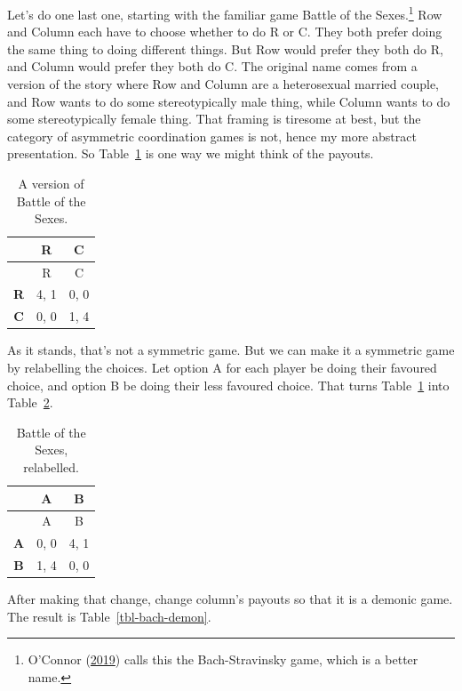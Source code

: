 \documentclass[
  12pt,
  letterpaper,
  DIV=11,
  numbers=noendperiod]{scrreprt}
\begin{document}
Let's do one last one, starting with the familiar game Battle of the
Sexes.\footnote{O'Connor (\protect\hyperlink{ref-OConnor2019}{2019})
  calls this the Bach-Stravinsky game, which is a better name.} Row and
Column each have to choose whether to do R or C. They both prefer doing
the same thing to doing different things. But Row would prefer they both
do R, and Column would prefer they both do C. The original name comes
from a version of the story where Row and Column are a heterosexual
married couple, and Row wants to do some stereotypically male thing,
while Column wants to do some stereotypically female thing. That framing
is tiresome at best, but the category of asymmetric coordination games
is not, hence my more abstract presentation. So
Table~\ref{tbl-bach-stravinsky} is one way we might think of the
payouts.

\hypertarget{tbl-bach-stravinsky}{}
\begin{longtable}[]{@{}ccc@{}}
\caption{\label{tbl-bach-stravinsky}A version of Battle of the
Sexes.}\tabularnewline
\toprule\noalign{}
& R & C \\
\midrule\noalign{}
\endfirsthead
\toprule\noalign{}
& R & C \\
\midrule\noalign{}
\endhead
\bottomrule\noalign{}
\endlastfoot
\textbf{R} & 4, 1 & 0, 0 \\
\textbf{C} & 0, 0 & 1, 4 \\
\end{longtable}

As it stands, that's not a symmetric game. But we can make it a
symmetric game by relabelling the choices. Let option A for each player
be doing their favoured choice, and option B be doing their less
favoured choice. That turns Table~\ref{tbl-bach-stravinsky} into
Table~\ref{tbl-bach-stravinsky-symmetric}.

\hypertarget{tbl-bach-stravinsky-symmetric}{}
\begin{longtable}[]{@{}ccc@{}}
\caption{\label{tbl-bach-stravinsky-symmetric}Battle of the Sexes,
relabelled.}\tabularnewline
\toprule\noalign{}
& A & B \\
\midrule\noalign{}
\endfirsthead
\toprule\noalign{}
& A & B \\
\midrule\noalign{}
\endhead
\bottomrule\noalign{}
\endlastfoot
\textbf{A} & 0, 0 & 4, 1 \\
\textbf{B} & 1, 4 & 0, 0 \\
\end{longtable}

After making that change, change column's payouts so that it is a
demonic game. The result is Table~\ref{tbl-bach-demon}.
\end{document}
